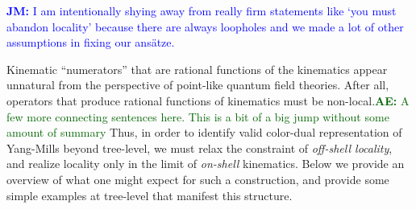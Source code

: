 \documentclass[11pt,letter]{article}
\newcommand{\ace}[1]{\textcolor{darkgreen}{\textbf{AE:}{ #1}}}
\newcommand{\jm}[1]{\textcolor{blue}{\textbf{JM: }{#1}}}
\newcommand{\ansatze}{ans\"atze} %
\begin{document}
\jm{I am intentionally shying away from really firm statements like
  `you must abandon locality' because there are always loopholes and
  we made a lot of other assumptions in fixing our \ansatze{}.}

Kinematic ``numerators'' that are rational functions of the kinematics
appear unnatural from the perspective of point-like quantum field
theories. After all, operators that produce rational functions of
kinematics must be non-local.\ace{A few more connecting sentences
  here.  This is a bit of a big jump without some amount of summary}
Thus, in order to identify valid color-dual representation of
Yang-Mills beyond tree-level, we must relax the constraint of
\textit{off-shell locality}, and realize locality only in the limit of
\textit{on-shell} kinematics. Below we provide an overview of what one
might expect for such a construction, and provide some simple examples
at tree-level that manifest this structure.
\end{document}
